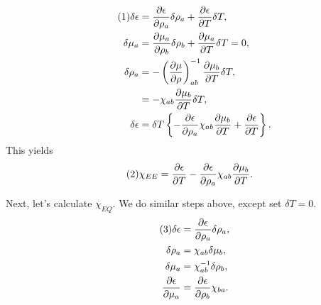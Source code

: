 \documentclass[12pt]{article}
\numberwithin{equation}{section}
\numberwithin{figure}{section}
\newcommand\eqnumber{\addtocounter{equation}{1}\tag{\theequation}}
\begin{document}
\begin{align*}\eqnumber
\delta\epsilon&=
\frac{\partial\epsilon}{\partial\rho_a}\delta\rho_a
+\frac{\partial\epsilon}{\partial T}\delta T,\\
\delta\mu_a&=\frac{\partial\mu_a}{\partial\rho_b}\delta\rho_b+\frac{\partial\mu_a}{\partial T}\delta T=0,\\
\delta\rho_a&=-\left(\frac{\partial\mu}{\partial\rho}\right)_{ab}^{-1}\frac{\partial\mu_b}{\partial T}\delta T,\\
&=-\chi_{ab}\frac{\partial\mu_b}{\partial T}\delta T,\\
\delta\epsilon&=\delta T\left\{
-\frac{\partial \epsilon}{\partial\rho_a}\chi_{ab}\frac{\partial\mu_b}{\partial T}+\frac{\partial\epsilon}{\partial T}
\right\}.
\end{align*}
This yields
\begin{align*}\eqnumber
\chi_{EE}&=\frac{\partial\epsilon}{\partial T}
-\frac{\partial\epsilon}{\partial\rho_a}\chi_{ab}\frac{\partial\mu_b}{\partial T}.
\end{align*}

Next, let's calculate $\chi_{EQ}$. We do similar steps above, except set $\delta T=0$.
\begin{align*}\eqnumber
\delta\epsilon&=\frac{\partial\epsilon}{\partial\rho_a}\delta\rho_a,\\
\delta\rho_a&=\chi_{ab}\delta\mu_b,\\
\delta\mu_a&=\chi^{-1}_{ab}\delta\rho_b,\\
\frac{\partial\epsilon}{\partial\mu_a}&=\frac{\partial\epsilon}{\partial\rho_b}\chi_{ba}.
\end{align*}
\end{document}
